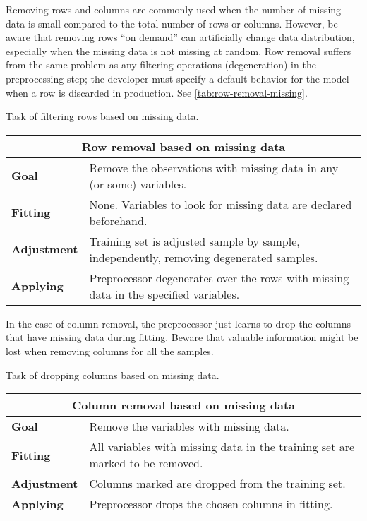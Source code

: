 Removing rows and columns are commonly used when the number of missing data is small
compared to the total number of rows or columns.  However, be aware that removing rows
``on demand'' can
artificially change data distribution, especially when the missing data is not missing at
random.  Row removal suffers from the same problem as any filtering operations
(degeneration) in the preprocessing step; the developer must specify a default behavior
for the model when a row is discarded in production.  See \cref{tab:row-removal-missing}.

\begin{tablebox}[label=tab:row-removal-missing]{Task of filtering rows based on missing data.}
  \centering
  \begin{tabular}{lp{6cm}}
    \toprule
    \multicolumn{2}{c}{\textbf{Row removal based on missing data}} \\
    \midrule
    \textbf{Goal} &
      Remove the observations with missing data in any (or some) variables. \\
    \textbf{Fitting} &
      None. Variables to look for missing data are declared beforehand. \\
    \textbf{Adjustment} &
      Training set is adjusted sample by sample, independently, removing
      degenerated samples. \\
    \textbf{Applying} &
      Preprocessor degenerates over the rows with missing data in the specified variables.
      \\
    \bottomrule
  \end{tabular}
\end{tablebox}

In the case of column removal, the
preprocessor just learns to drop the columns that have missing data during fitting.
Beware that valuable information might be lost when removing columns for all the samples.

\begin{tablebox}[label=tab:col-drop-missing]{Task of dropping columns based on missing data.}
  \centering
  \begin{tabular}{lp{6cm}}
    \toprule
    \multicolumn{2}{c}{\textbf{Column removal based on missing data}} \\
    \midrule
    \textbf{Goal} &
      Remove the variables with missing data. \\
    \textbf{Fitting} &
      All variables with missing data in the training set are marked to be removed. \\
    \textbf{Adjustment} &
      Columns marked are dropped from the training set. \\
    \textbf{Applying} &
      Preprocessor drops the chosen columns in fitting. \\
    \bottomrule
  \end{tabular}
\end{tablebox}


